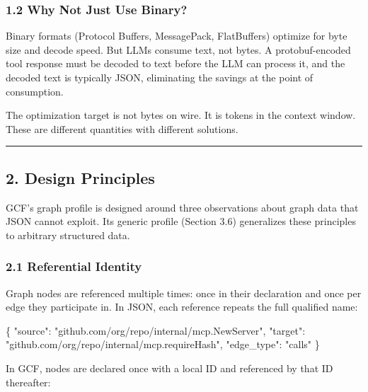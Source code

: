 \documentclass[
  11pt,
  paper=a4,
  ,captions=tableheading
]{scrartcl}
\newenvironment{Shaded}{}{}
\newcommand{\DataTypeTok}[1]{\textcolor[rgb]{0.56,0.13,0.00}{#1}}
\newcommand{\FunctionTok}[1]{\textcolor[rgb]{0.02,0.16,0.49}{#1}}
\newcommand{\StringTok}[1]{\textcolor[rgb]{0.25,0.44,0.63}{#1}}
\begin{document}
\subsubsection{1.2 Why Not Just Use
Binary?}\label{why-not-just-use-binary}

Binary formats (Protocol Buffers, MessagePack, FlatBuffers) optimize for
byte size and decode speed. But LLMs consume text, not bytes. A
protobuf-encoded tool response must be decoded to text before the LLM
can process it, and the decoded text is typically JSON, eliminating the
savings at the point of consumption.

The optimization target is not bytes on wire. It is tokens in the
context window. These are different quantities with different solutions.

\begin{center}\rule{0.5\linewidth}{0.5pt}\end{center}

\subsection{2. Design Principles}\label{design-principles}

GCF's graph profile is designed around three observations about graph
data that JSON cannot exploit. Its generic profile (Section 3.6)
generalizes these principles to arbitrary structured data.

\subsubsection{2.1 Referential Identity}\label{referential-identity}

Graph nodes are referenced multiple times: once in their declaration and
once per edge they participate in. In JSON, each reference repeats the
full qualified name:

\begin{Shaded}
\begin{Highlighting}[]
\FunctionTok{\{}
  \DataTypeTok{"source"}\FunctionTok{:} \StringTok{"github.com/org/repo/internal/mcp.NewServer"}\FunctionTok{,}
  \DataTypeTok{"target"}\FunctionTok{:} \StringTok{"github.com/org/repo/internal/mcp.requireHash"}\FunctionTok{,}
  \DataTypeTok{"edge\_type"}\FunctionTok{:} \StringTok{"calls"}
\FunctionTok{\}}
\end{Highlighting}
\end{Shaded}

In GCF, nodes are declared once with a local ID and referenced by that
ID thereafter:
\end{document}
